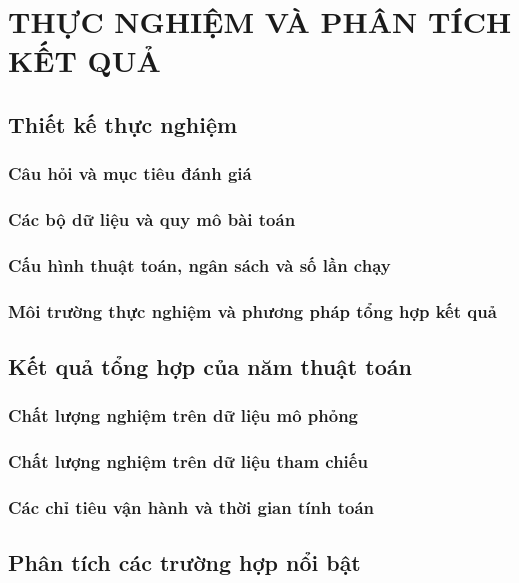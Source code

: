 \section{THỰC NGHIỆM VÀ PHÂN TÍCH KẾT QUẢ}
\label{sec:chuong4}

\subsection{Thiết kế thực nghiệm}

\subsubsection{Câu hỏi và mục tiêu đánh giá}

\subsubsection{Các bộ dữ liệu và quy mô bài toán}

\subsubsection{Cấu hình thuật toán, ngân sách và số lần chạy}

\subsubsection{Môi trường thực nghiệm và phương pháp tổng hợp kết quả}

\subsection{Kết quả tổng hợp của năm thuật toán}

\subsubsection{Chất lượng nghiệm trên dữ liệu mô phỏng}

\subsubsection{Chất lượng nghiệm trên dữ liệu tham chiếu}

\subsubsection{Các chỉ tiêu vận hành và thời gian tính toán}

\subsection{Phân tích các trường hợp nổi bật}

